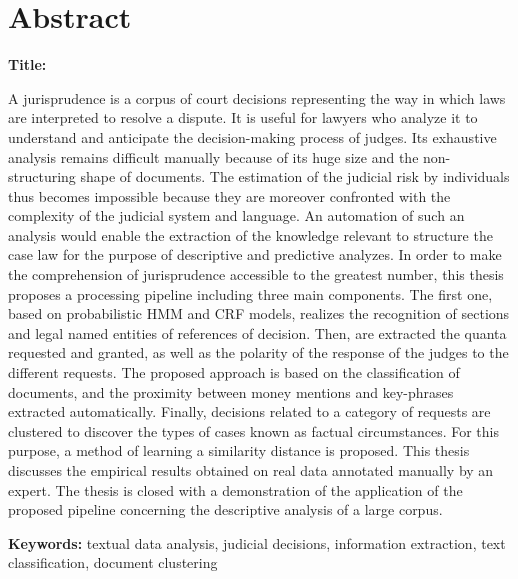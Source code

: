 \chapter*{Abstract}
\textbf{Title:} \textsc{\titleen}

A jurisprudence is a corpus of court decisions representing the way in which laws are interpreted to resolve a dispute. It is useful for lawyers who analyze it to understand and anticipate the decision-making process of judges. Its exhaustive analysis remains difficult manually because of its huge size and the non-structuring shape of documents. The estimation of the judicial risk by individuals thus becomes impossible because they are moreover confronted with the complexity of  the judicial system and language. An automation of such an analysis would enable the extraction of the knowledge relevant to structure the case law for the purpose of descriptive and predictive analyzes.
In order to make the comprehension of jurisprudence accessible to the greatest number, this thesis proposes a processing pipeline including three main components. The first one, based on probabilistic HMM and CRF models, realizes the recognition of sections and legal named entities of references of decision. Then, are extracted the quanta requested and granted, as well as the polarity of the response of the judges to the different requests. The proposed approach is based on the classification of documents, and the proximity between money mentions and key-phrases extracted automatically. Finally, decisions related to a category of requests are clustered to discover the types of cases known as factual circumstances. For this purpose, a method of learning a similarity distance is proposed.
This thesis discusses the empirical results obtained on real data annotated manually by an expert. The thesis is closed with a demonstration of the application of the proposed pipeline concerning the descriptive analysis of a large corpus.

\textbf{Keywords:} textual data analysis, judicial decisions, information extraction, text classification, document clustering



